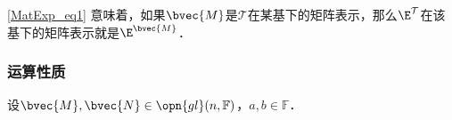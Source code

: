 \autoref{MatExp_eq1} 意味着，如果$\bvec{M}$是$\mathcal{T}$在某基下的矩阵表示，那么$\E^\mathcal{T}$在该基下的矩阵表示就是$\E^\bvec{M}$．

\subsubsection{运算性质}

设$\bvec{M}, \bvec{N}\in \opn{gl}(n, \mathbb{F})$，$a, b\in\mathbb{F}$．








